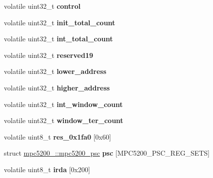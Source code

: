 \begin{DoxyCompactItemize}
\mbox{\label{structmpc5200___a8899f31fcc18fae44d63b1208a6fe269}} 
volatile uint32\+\_\+t {\bfseries control}
\item 
\mbox{\label{structmpc5200___add488797f6a7bd3dec128c0e2d257003}} 
volatile uint32\+\_\+t {\bfseries init\+\_\+total\+\_\+count}
\item 
\mbox{\label{structmpc5200___ab90a029b6148e4d4ceb456db458ce198}} 
volatile uint32\+\_\+t {\bfseries int\+\_\+total\+\_\+count}
\item 
\mbox{\label{structmpc5200___a0156f0aba12afff28f37516e67e6a637}} 
volatile uint32\+\_\+t {\bfseries reserved19}
\item 
\mbox{\label{structmpc5200___ad79e4cb615be9cbe6bbdc395d0d845b5}} 
volatile uint32\+\_\+t {\bfseries lower\+\_\+address}
\item 
\mbox{\label{structmpc5200___a8d3784fafe0698dcc2ff78c6e54915ef}} 
volatile uint32\+\_\+t {\bfseries higher\+\_\+address}
\item 
\mbox{\label{structmpc5200___af8de9eb7fcf8f4970dd46fee29877114}} 
volatile uint32\+\_\+t {\bfseries int\+\_\+window\+\_\+count}
\item 
\mbox{\label{structmpc5200___a575b9804c14a2b3cc99bb2b3a662e72e}} 
volatile uint32\+\_\+t {\bfseries window\+\_\+ter\+\_\+count}
\item 
\mbox{\label{structmpc5200___a06295971cf4443331fff5c1b82b4f678}} 
volatile uint8\+\_\+t {\bfseries res\+\_\+0x1fa0} \mbox{[}0x60\mbox{]}
\item 
\mbox{\label{structmpc5200___afe31cbdb51d65073d09177e43d20f6a8}} 
struct \mbox{\hyperlink{structmpc5200___1_1mpc5200__psc}{mpc5200\+\_\+\+::mpc5200\+\_\+psc}} {\bfseries psc} \mbox{[}M\+P\+C5200\+\_\+\+P\+S\+C\+\_\+\+R\+E\+G\+\_\+\+S\+E\+TS\mbox{]}
\item 
\mbox{\label{structmpc5200___adb98200b499f54299b819737ee6aead1}} 
volatile uint8\+\_\+t {\bfseries irda} \mbox{[}0x200\mbox{]}

\end{DoxyCompactItemize}
